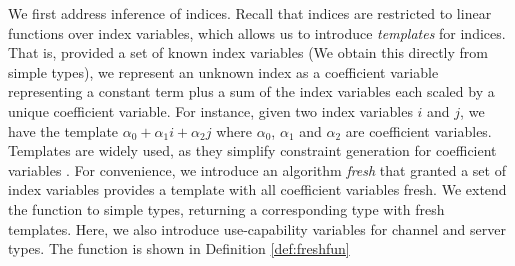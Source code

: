 We first address inference of indices. Recall that indices are restricted to linear functions over index variables, which allows us to introduce \textit{templates} for indices. That is, provided a set of known index variables (We obtain this directly from simple types), we represent an unknown index as a coefficient variable representing a constant term plus a sum of the index variables each scaled by a unique coefficient variable. For instance, given two index variables $i$ and $j$, we have the template $\alpha_0 + \alpha_1 i + \alpha_2 j$ where $\alpha_0$, $\alpha_1$ and $\alpha_2$ are coefficient variables. Templates are widely used, as they simplify constraint generation for coefficient variables \cite{HofmannAndJost2003,HofmannAndHoffmann2010,HoffmannEtAl2012}. For convenience, we introduce an algorithm \textit{fresh} that granted a set of index variables provides a template with all coefficient variables fresh. We extend the function to simple types, returning a corresponding type with fresh templates. Here, we also introduce use-capability variables for channel and server types. The function is shown in Definition \ref{def:freshfun}
%
